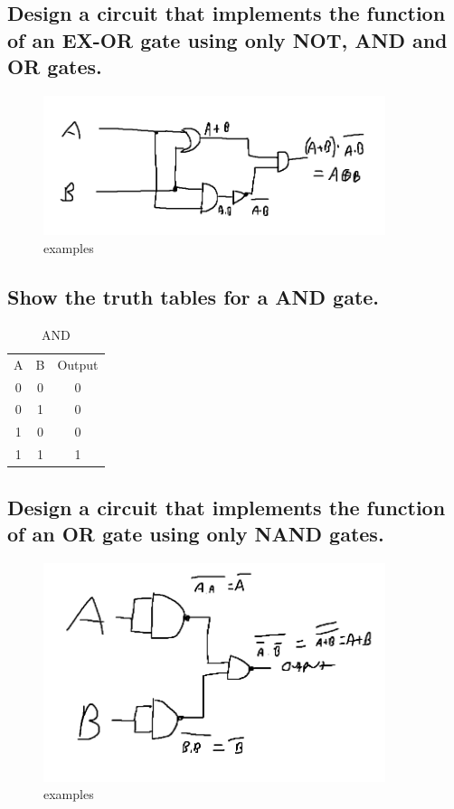 \documentclass{article}
\begin{document}
\subsection{Design a circuit that implements the function of an EX-OR gate using only NOT, AND and OR gates.}

\begin{figure}[h]
    \centering
    \includegraphics[width=100mm]{digitalLogic2.PNG}
    \caption{examples}
    \label{fig:my_label}
\end{figure}
\newpage
\subsection{Show the truth tables for a AND gate.}
\begin{table}[h]
    \centering
    \begin{tabular}{|c|c|c|}
        A & B & Output \\
        0 & 0 & 0\\
        0 & 1 & 0\\
        1 & 0 & 0\\
        1 & 1 & 1\\
    \end{tabular}
    \caption{AND}
    \label{tab:my_label}
\end{table}

\subsection{Design a circuit that implements the function of an OR gate using only NAND gates.}
\begin{figure}[h]
    \centering
    \includegraphics[width=100mm]{digitalLogic3.PNG}
    \caption{examples}
    \label{fig:my_label}
\end{figure}
\newpage
\end{document}
